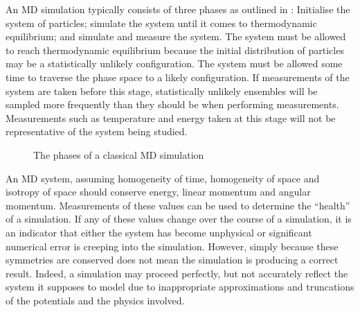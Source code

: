 %
An MD simulation typically consists of three phases as outlined in
:
Initialise the system of particles;
simulate the system until it comes to thermodynamic equilibrium; and
simulate and measure the system.
%
The system must be allowed to reach thermodynamic equilibrium because
the initial distribution of particles may be a statistically unlikely
configuration.
%
The system must be allowed some time to traverse the phase space to
a likely configuration.
%
If measurements of the system are taken before this stage,
statistically unlikely ensembles will be sampled more frequently than
they should be when performing measurements.
%
Measurements such as
temperature and energy
taken at this stage will not be
representative of the system being studied.

\begin{figure}[!h]
    \begin{center}
    \end{center}
    \caption{The phases of a classical MD simulation}
    \label{fig:phases_of_md_simulation}
\end{figure}


%
An MD system,
assuming homogeneity of time,
homogeneity of space and
isotropy of space
should conserve energy, linear momentum and angular momentum.
%
Measurements of these values can be used to
determine the ``health'' of a simulation.
%
If any of these values change over the course of a simulation,
it is an indicator that either the system has become unphysical or
significant numerical error is creeping into the simulation.
%
However, simply because these symmetries are conserved does not mean
the simulation is producing a correct result.
%
Indeed, a simulation may proceed perfectly, but not accurately reflect
the system it supposes to model due to
inappropriate approximations and truncations of
the potentials and the physics involved.




